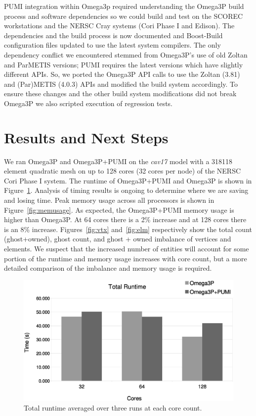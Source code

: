 \documentclass[a4paper]{article}
\begin{document}
PUMI integration within Omega3p required understanding the Omega3P build process
and software dependencies so we could build and test on the SCOREC workstations
and the NERSC Cray systems (Cori Phase I and Edison).
The dependencies and the build process is now documented and Boost-Build
configuration files updated to use the latest system compilers.
The only dependency conflict we encountered stemmed from Omega3P's use of old
Zoltan and ParMETIS versions; PUMI requires the latest versions which have
slightly different APIs.
So, we ported the Omega3P API calls to use the Zoltan (3.81) and
(Par)METIS (4.0.3) APIs and modified the build system accordingly.
To ensure these changes and the other build system modifications did not break
Omega3P we also scripted execution of regression tests.

\section{Results and Next Steps}

We ran Omega3P and Omega3P+PUMI on the \textit{cav17} model with a 318118
element quadratic mesh on up to 128 cores (32 cores per node) of the NERSC Cori
Phase I system.
The runtime of Omega3P+PUMI and Omega3P is shown in Figure~\ref{fig:time}.
Analysis of timing results is ongoing to determine where we are saving and
losing time.
Peak memory usage across all processors is shown in
Figure~\ref{fig:memusage}.
As expected, the Omega3P+PUMI memory usage is higher than Omega3P.
At 64 cores there is a 2\% increase and at 128 cores there is an 8\% increase.
Figures~\ref{fig:vtx} and~\ref{fig:elm} respectively show the total count
(ghost+owned), ghost count, and ghost + owned imbalance of vertices and
elements.
We suspect that the increased number of entities will account for some portion
of the runtime and memory usage increases with core count, but a more detailed
comparison of the imbalance and memory usage is required.

\begin{figure}[ht]
\centering
  \includegraphics[width=\textwidth]{total-runtime.eps}
  \caption{\label{fig:time} Total runtime averaged over three runs at each core
  count.}
\end{figure}
\end{document}
